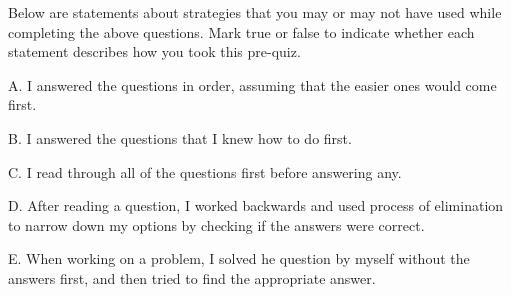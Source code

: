 \documentclass{ximera}
\begin{document}
\begin{question}

Below are statements about strategies that you may or may not have used while completing the above questions.  Mark true or false to indicate whether each statement describes how you took this pre-quiz. 

\begin{question}

    A. I answered the questions in order, assuming that the easier ones would come first.

    \begin{multipleChoice}
    \end{multipleChoice}
    
\end{question}
\begin{question}
    
    B. I answered the questions that I knew how to do first.

    \begin{multipleChoice}
    \end{multipleChoice}
    
\end{question}
\begin{question}
    
    C. I read through all of the questions first before answering any.

    \begin{multipleChoice}
    \end{multipleChoice}
    
\end{question}
\begin{question}
    
    D. After reading a question, I worked backwards and used process of elimination to narrow down my options by checking if the answers were correct.

    \begin{multipleChoice}
    \end{multipleChoice}
    
\end{question}  
\begin{question}    
    
    E. When working on a problem, I solved he question by myself without the answers first, and then tried to find the appropriate answer.


\end{question}
\end{question}
\end{document}

